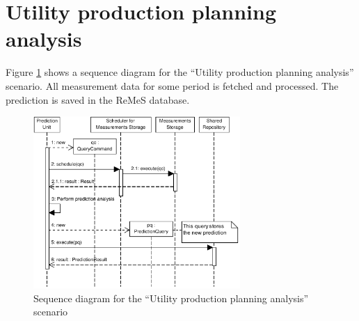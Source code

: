 \section{Utility production planning analysis}
\label{scenario:production-planning}

\npar Figure \ref{fig:scenario-5-7} shows a sequence diagram for the ``Utility
production planning analysis'' scenario. All measurement data for some period is
fetched and processed. The prediction is saved in the ReMeS database.

\begin{figure}[H]
	\begin{centering}
		\includegraphics[width=0.7\textwidth]{figs/scenario-5-7.pdf}
		\caption{Sequence diagram for the ``Utility production planning analysis'' scenario}
		\label{fig:scenario-5-7}
	\end{centering}
\end{figure}
